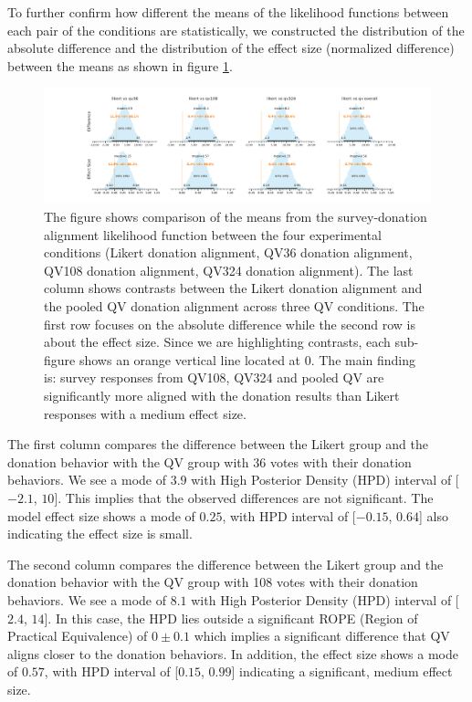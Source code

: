 To further confirm how different the means 
of the likelihood functions 
between each pair of the conditions are statistically, 
we constructed the distribution 
of the absolute difference and 
the distribution of the effect size 
(normalized difference) 
between the means as shown in figure \ref{fig:contrast_exp1}.

\begin{figure}[htpb]
  \centering
  \includegraphics[trim= 2in 0in 2in 0in, clip, width=\textwidth, keepaspectratio=true]{"content/image/Votes_vs_Absolute_Donation_StudentT_differences_and_effects.pdf"}
  \caption{
    The figure shows comparison of the means from the survey-donation alignment likelihood function between the four experimental conditions (Likert donation alignment, QV36 donation alignment, QV108 donation alignment, QV324 donation alignment). The last column shows contrasts between the Likert donation alignment and the pooled QV donation alignment across three QV conditions. The first row focuses on the absolute difference while the second row is about the effect size. Since we are highlighting contrasts, each sub-figure shows an orange vertical line located at 0. The main finding is: survey responses from QV108, QV324 and pooled QV are significantly more aligned with the donation results than Likert responses with a medium effect size.
  }
  \label{fig:contrast_exp1}
\end{figure}

The first column compares the difference between the Likert group
and the donation behavior with the QV group with $36$ votes
with their donation behaviors. We see a mode of $3.9$
with High Posterior Density (HPD) interval of [$-2.1$, $10$].
This implies that the observed differences are not significant.
The model effect size shows a mode of $0.25$, 
with HPD interval of [$-0.15$, $0.64$] 
also indicating the effect size is small.

The second column compares the difference between the Likert group
and the donation behavior with the QV group with 108 votes
with their donation behaviors. We see a mode of $8.1$
with High Posterior Density (HPD) interval of [$2.4$, $14$].
In this case, the HPD lies outside a significant ROPE (Region of Practical Equivalence) of $0 \pm 0.1$
which implies a significant difference that
QV aligns closer to the donation behaviors.
In addition, the effect size shows a mode of $0.57$, 
with HPD interval of [$0.15$, $0.99$] 
indicating a significant, medium effect size.

